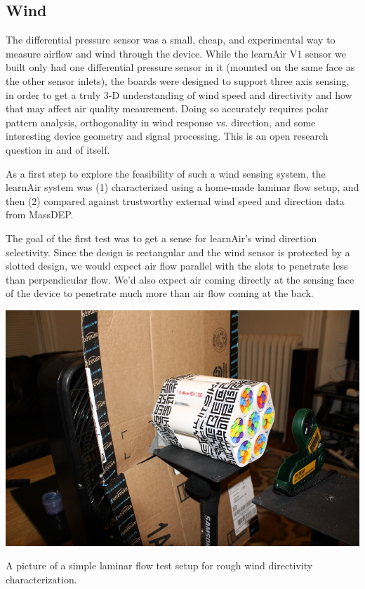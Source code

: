 \subsection{Wind}
\FloatBarrier

The differential pressure sensor was a small, cheap, and experimental way to measure airflow and wind through the device.  While the learnAir V1 sensor we built only had one differential pressure sensor in it (mounted on the same face as the other sensor inlets), the boards were designed to support three axis sensing, in order to get a truly 3-D understanding of wind speed and directivity and how that may affect air quality meaurement.  Doing so accurately requires polar pattern analysis, orthogonality in wind response vs. direction, and some interesting device geometry and signal processing.  This is an open research question in and of itself.

As a first step to explore the feasibility of such a wind sensing system, the learnAir system was (1) characterized using a home-made laminar flow setup, and then (2) compared against trustworthy external wind speed and direction data from MassDEP.  

The goal of the first test was to get a sense for learnAir's wind direction selectivity.  Since the design is rectangular and the wind sensor is protected by a slotted design, we would expect air flow parallel with the slots to penetrate less than perpendicular flow.  We'd also expect air coming directly at the sensing face of the device to penetrate much more than air flow coming at the back.

\begin{marginfigure}
 	\includegraphics[width=\textwidth]{visuals/windtest}               
 	 \caption{A picture of a simple laminar flow test setup for rough wind directivity characterization.}
  	\label{fig:windtest}
\end{marginfigure}

